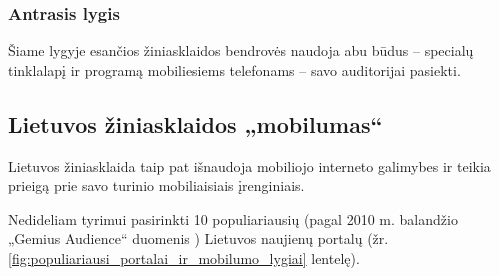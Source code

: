 \documentclass[kursinis-darbas]{vukf}
\begin{document}
\subsubsection{Antrasis lygis}

Šiame lygyje esančios žiniasklaidos bendrovės naudoja abu būdus – specialų tinklalapį ir programą mobiliesiems telefonams – savo auditorijai pasiekti.


\subsection{Lietuvos žiniasklaidos „mobilumas“}

Lietuvos žiniasklaida taip pat išnaudoja mobiliojo interneto galimybes ir teikia prieigą prie savo turinio mobiliaisiais įrenginiais.

Nedideliam tyrimui pasirinkti 10 populiariausių (pagal 2010 m. balandžio „Gemius Audience“ duomenis \cite{gemiusaudience_2010_april_by_reach}) Lietuvos naujienų portalų (žr. \ref{fig:populiariausi_portalai_ir_mobilumo_lygiai} lentelę).
\end{document}
